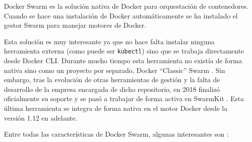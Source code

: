 Docker Swarm es la solución nativa de Docker para orquestación de contenedores.
Cuando se hace una instalación de Docker automáticamente se ha instalado el gestor
Swarm para manejar motores de Docker.

Esta solución es muy interesante ya que no hace falta instalar ninguna herramienta
externa (como puede ser \texttt{kubectl}) sino que se trabaja directamente desde
Docker CLI. Durante mucho tiempo esta herramienta no existía de forma nativa sino
como un proyecto por separado, Docker ``Classic'' Swarm \autocite{DockerClassicswarm2021}.
Sin embargo, tras la evolución de otras herramientas de gestión y la falta
de desarrollo de la empresa encargada de dicho repositorio, en 2018 finalizó
oficialmente su soporte y se pasó a trabajar de forma activa en SwarmKit \autocite{DockerSwarmkit2021}.
Esta última herramienta se integra de forma nativa en el motor Docker desde
la versión 1.12 en adelante.

Entre todas las características de Docker Swarm, algunas interesantes son
\autocite{SwarmModeOverview2021}:


